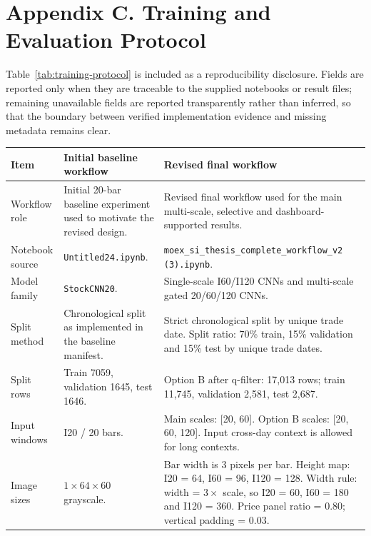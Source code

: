 \section*{Appendix C. Training and Evaluation Protocol}

Table~\ref{tab:training-protocol} is included as a reproducibility disclosure. Fields are reported only when they are traceable to the supplied notebooks or result files; remaining unavailable fields are reported transparently rather than inferred, so that the boundary between verified implementation evidence and missing metadata remains clear.

\begin{center}
\label{tab:training-protocol}
\scriptsize
\setlength{\tabcolsep}{3pt}
\renewcommand{\arraystretch}{1.05}
\begin{tabular}{p{}p{}p{}}
\toprule
Item & Initial baseline workflow & Revised final workflow \\
\midrule
Workflow role & Initial 20-bar baseline experiment used to motivate the revised design. & Revised final workflow used for the main multi-scale, selective and dashboard-supported results. \\
Notebook source & \texttt{Untitled24.ipynb}. & \texttt{moex\_si\_thesis\_complete\_workflow\_v2 (3).ipynb}. \\
Model family & \texttt{StockCNN20}. & Single-scale I60/I120 CNNs and multi-scale gated 20/60/120 CNNs. \\
Split method & Chronological split as implemented in the baseline manifest. & Strict chronological split by unique trade date. Split ratio: 70\% train, 15\% validation and 15\% test by unique trade dates. \\
Split rows & Train 7059, validation 1645, test 1646. & Option B after q-filter: 17,013 rows; train 11,745, validation 2,581, test 2,687. \\
Input windows & I20 / 20 bars. & Main scales: [20, 60]. Option B scales: [20, 60, 120]. Input cross-day context is allowed for long contexts. \\
Image sizes & $1\times64\times60$ grayscale. & Bar width is 3 pixels per bar. Height map: I20 = 64, I60 = 96, I120 = 128. Width rule: width = $3\times$ scale, so I20 = 60, I60 = 180 and I120 = 360. Price panel ratio = 0.80; vertical padding = 0.03. \\

\end{tabular}
\end{center}
